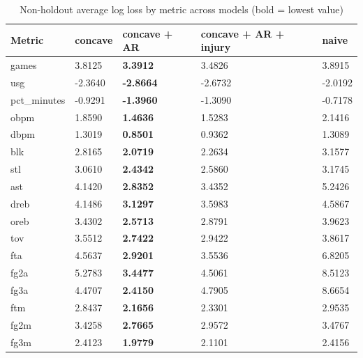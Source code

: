 \begin{table}
\caption{Non-holdout average log loss by metric across models (bold = lowest value)}
\label{tab:non_holdout_log_loss_all_models}
\begin{tabular}{lllll}
\toprule
Metric & concave & concave + AR & concave + AR + injury & naive \\
\midrule
games & 3.8125 & \textbf{3.3912} & 3.4826 & 3.8915 \\
usg & -2.3640 & \textbf{-2.8664} & -2.6732 & -2.0192 \\
pct_minutes & -0.9291 & \textbf{-1.3960} & -1.3090 & -0.7178 \\
obpm & 1.8590 & \textbf{1.4636} & 1.5283 & 2.1416 \\
dbpm & 1.3019 & \textbf{0.8501} & 0.9362 & 1.3089 \\
blk & 2.8165 & \textbf{2.0719} & 2.2634 & 3.1577 \\
stl & 3.0610 & \textbf{2.4342} & 2.5860 & 3.1745 \\
ast & 4.1420 & \textbf{2.8352} & 3.4352 & 5.2426 \\
dreb & 4.1486 & \textbf{3.1297} & 3.5983 & 4.5867 \\
oreb & 3.4302 & \textbf{2.5713} & 2.8791 & 3.9623 \\
tov & 3.5512 & \textbf{2.7422} & 2.9422 & 3.8617 \\
fta & 4.5637 & \textbf{2.9201} & 3.5536 & 6.8205 \\
fg2a & 5.2783 & \textbf{3.4477} & 4.5061 & 8.5123 \\
fg3a & 4.4707 & \textbf{2.4150} & 4.7905 & 8.6654 \\
ftm & 2.8437 & \textbf{2.1656} & 2.3301 & 2.9535 \\
fg2m & 3.4258 & \textbf{2.7665} & 2.9572 & 3.4767 \\
fg3m & 2.4123 & \textbf{1.9779} & 2.1101 & 2.4156 \\
\bottomrule
\end{tabular}
\end{table}
